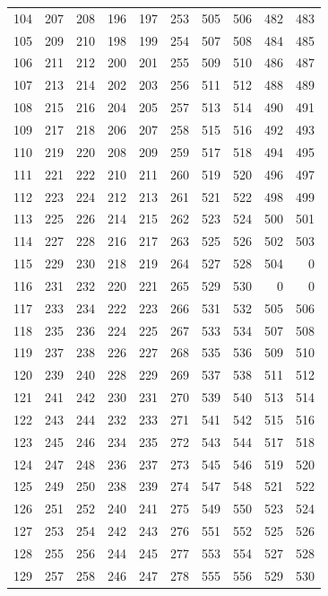 \begin{longtable}{rrrrr@{\qquad}rrrrr}
104 & 207 & 208 & 196 & 197 & 253 & 505 & 506 & 482 & 483 \\
105 & 209 & 210 & 198 & 199 & 254 & 507 & 508 & 484 & 485 \\
106 & 211 & 212 & 200 & 201 & 255 & 509 & 510 & 486 & 487 \\
107 & 213 & 214 & 202 & 203 & 256 & 511 & 512 & 488 & 489 \\
108 & 215 & 216 & 204 & 205 & 257 & 513 & 514 & 490 & 491 \\
109 & 217 & 218 & 206 & 207 & 258 & 515 & 516 & 492 & 493 \\
110 & 219 & 220 & 208 & 209 & 259 & 517 & 518 & 494 & 495 \\
111 & 221 & 222 & 210 & 211 & 260 & 519 & 520 & 496 & 497 \\
112 & 223 & 224 & 212 & 213 & 261 & 521 & 522 & 498 & 499 \\
113 & 225 & 226 & 214 & 215 & 262 & 523 & 524 & 500 & 501 \\
114 & 227 & 228 & 216 & 217 & 263 & 525 & 526 & 502 & 503 \\
115 & 229 & 230 & 218 & 219 & 264 & 527 & 528 & 504 & 0 \\
116 & 231 & 232 & 220 & 221 & 265 & 529 & 530 & 0 & 0 \\
117 & 233 & 234 & 222 & 223 & 266 & 531 & 532 & 505 & 506 \\
118 & 235 & 236 & 224 & 225 & 267 & 533 & 534 & 507 & 508 \\
119 & 237 & 238 & 226 & 227 & 268 & 535 & 536 & 509 & 510 \\
120 & 239 & 240 & 228 & 229 & 269 & 537 & 538 & 511 & 512 \\
121 & 241 & 242 & 230 & 231 & 270 & 539 & 540 & 513 & 514 \\
122 & 243 & 244 & 232 & 233 & 271 & 541 & 542 & 515 & 516 \\
123 & 245 & 246 & 234 & 235 & 272 & 543 & 544 & 517 & 518 \\
124 & 247 & 248 & 236 & 237 & 273 & 545 & 546 & 519 & 520 \\
125 & 249 & 250 & 238 & 239 & 274 & 547 & 548 & 521 & 522 \\
126 & 251 & 252 & 240 & 241 & 275 & 549 & 550 & 523 & 524 \\
127 & 253 & 254 & 242 & 243 & 276 & 551 & 552 & 525 & 526 \\
128 & 255 & 256 & 244 & 245 & 277 & 553 & 554 & 527 & 528 \\
129 & 257 & 258 & 246 & 247 & 278 & 555 & 556 & 529 & 530 \\

\end{longtable}

